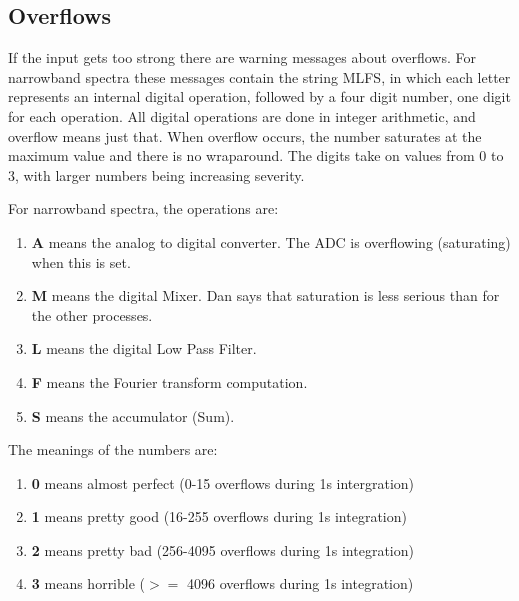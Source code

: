 \documentclass[psfig,preprint]{aastex}
\begin{document}
\subsection{Overflows}

	If the input gets too strong there are warning messages about
overflows. For narrowband spectra these messages contain the string
MLFS, in which each letter represents an internal digital operation,
followed by a four digit number, one digit for each operation. All
digital operations are done in integer arithmetic, and overflow means
just that. When overflow occurs, the number saturates at the maximum
value and there is no wraparound. The digits take on values from 0 to 3,
with larger numbers being increasing severity.

	For narrowband spectra, the operations are: \begin{enumerate}

	\item {\bf A} means the analog to digital converter.  The ADC
is overflowing (saturating) when this is set.

	\item {\bf M} means the digital Mixer. Dan says that saturation
is less serious than for the other processes. 

	\item {\bf L} means the digital Low Pass Filter. 

	\item {\bf F} means the Fourier transform computation.

	\item {\bf S} means the accumulator (Sum).

\end{enumerate}

	The meanings of the numbers are: \begin{enumerate}

\item {\bf 0} means almost perfect  (0-15 overflows during 1s intergration)

\item {\bf 1} means pretty good (16-255 overflows during 1s integration)

\item {\bf 2} means pretty bad  (256-4095 overflows during 1s integration)

\item {\bf 3} means horrible ($>=$ 4096 overflows during 1s integration)

\end{enumerate}
\end{document}
